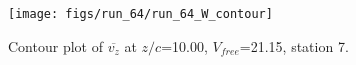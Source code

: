\begin{figure}[H]
\centering
\texttt{[image: figs/run\_64/run\_64\_W\_contour]}
\caption{Contour plot of $\overline{v_{z}}$ at $z/c$=10.00, $V_{free}$=21.15, station 7.}
\label{fig:run_64_W_contour}
\end{figure}


